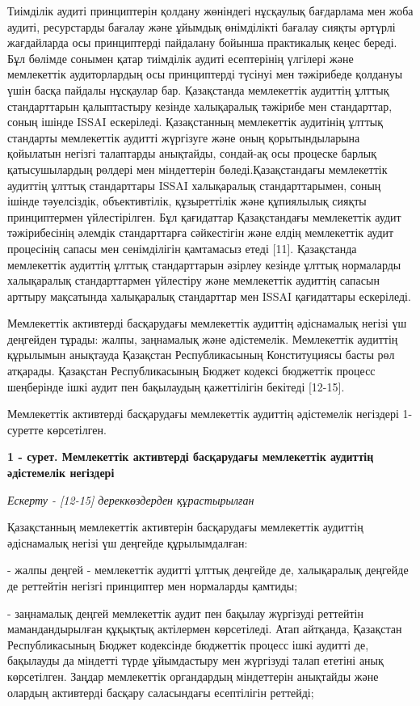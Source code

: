 Тиімділік аудиті принциптерін қолдану жөніндегі нұсқаулық бағдарлама мен
жоба аудиті, ресурстарды бағалау және ұйымдық өнімділікті бағалау сияқты
әртүрлі жағдайларда осы принциптерді пайдалану бойынша практикалық кеңес
береді. Бұл бөлімде сонымен қатар тиімділік аудиті есептерінің үлгілері
және мемлекеттік аудиторлардың осы принциптерді түсінуі мен тәжірибеде
қолдануы үшін басқа пайдалы нұсқаулар бар. Қазақстанда мемлекеттік
аудиттің ұлттық стандарттарын қалыптастыру кезінде халықаралық тәжірибе
мен стандарттар, соның ішінде ISSAI ескеріледі. Қазақстанның мемлекеттік
аудитінің ұлттық стандарты мемлекеттік аудитті жүргізуге және оның
қорытындыларына қойылатын негізгі талаптарды анықтайды, сондай-ақ осы
процеске барлық қатысушылардың рөлдері мен міндеттерін
бөледі.Қазақстандағы мемлекеттік аудиттің ұлттық стандарттары ISSAI
халықаралық стандарттарымен, соның ішінде тәуелсіздік, объективтілік,
құзыреттілік және құпиялылық сияқты принциптермен үйлестірілген. Бұл
қағидаттар Қазақстандағы мемлекеттік аудит тәжірибесінің әлемдік
стандарттарға сәйкестігін және елдің мемлекеттік аудит процесінің сапасы
мен сенімділігін қамтамасыз етеді {[}11{]}. Қазақстанда мемлекеттік
аудиттің ұлттық стандарттарын әзірлеу кезінде ұлттық нормаларды
халықаралық стандарттармен үйлестіру және мемлекеттік аудиттің сапасын
арттыру мақсатында халықаралық стандарттар мен ISSAI қағидаттары
ескеріледі.

Мемлекеттік активтерді басқарудағы мемлекеттік аудиттің әдіснамалық
негізі үш деңгейден тұрады: жалпы, заңнамалық және әдістемелік.
Мемлекеттік аудиттің құрылымын анықтауда Қазақстан Республикасының
Конституциясы басты рөл атқарады. Қазақстан Республикасының Бюджет
кодексі бюджеттік процесс шеңберінде ішкі аудит пен бақылаудың
қажеттілігін бекітеді {[}12-15{]}.

Мемлекеттік активтерді басқарудағы мемлекеттік аудиттің әдістемелік
негіздері 1-суретте көрсетілген.

{\bfseries 1 - сурет. Мемлекеттік активтерді басқарудағы мемлекеттік
аудиттің әдістемелік негіздері}

\emph{Ескерту - {[}12-15{]} дереккөздерден құрастырылған}

Қазақстанның мемлекеттік активтерін басқарудағы мемлекеттік аудиттің
әдіснамалық негізі үш деңгейде құрылымдалған:

- жалпы деңгей - мемлекеттік аудитті ұлттық деңгейде де, халықаралық
деңгейде де реттейтін негізгі принциптер мен нормаларды қамтиды;

- заңнамалық деңгей мемлекеттік аудит пен бақылау жүргізуді реттейтін
мамандандырылған құқықтық актілермен көрсетіледі. Атап айтқанда,
Қазақстан Республикасының Бюджет кодексінде бюджеттік процесс ішкі
аудитті де, бақылауды да міндетті түрде ұйымдастыру мен жүргізуді талап
ететіні анық көрсетілген. Заңдар мемлекеттік органдардың міндеттерін
анықтайды және олардың активтерді басқару саласындағы есептілігін
реттейді;

